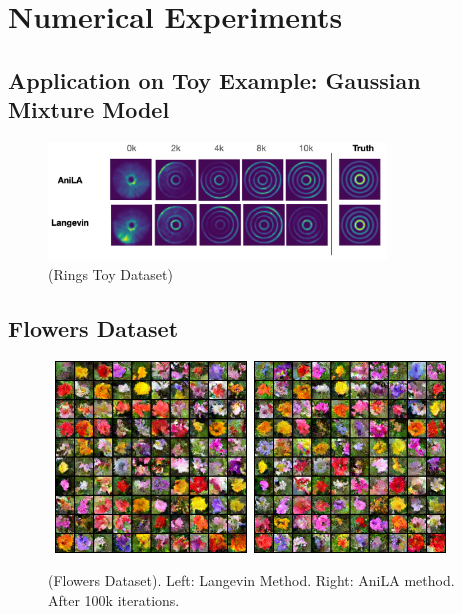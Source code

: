 \documentclass{article}
\begin{document}
\clearpage
\section{Numerical Experiments}\label{sec:numericals}

\subsection{Application on Toy Example: Gaussian Mixture Model}

\begin{figure}[H]
\begin{center}
\includegraphics[width=0.8\textwidth]{figs/rings}
\caption{(Rings Toy Dataset) }
\label{fig:results}
\end{center}
\end{figure}


\subsection{Flowers Dataset}

\begin{figure}[H]
    \begin{center}
        \mbox{
        \includegraphics[width=2in]{figs/flowerslangevin}
        \includegraphics[width=2in]{figs/flowersanila}
        }
    \end{center}
    \vspace{-0.1in}
	\caption{(Flowers Dataset). Left: Langevin Method. Right: AniLA method. After 100k iterations.}
	\label{fig:flowers}
\end{figure}
\end{document}
